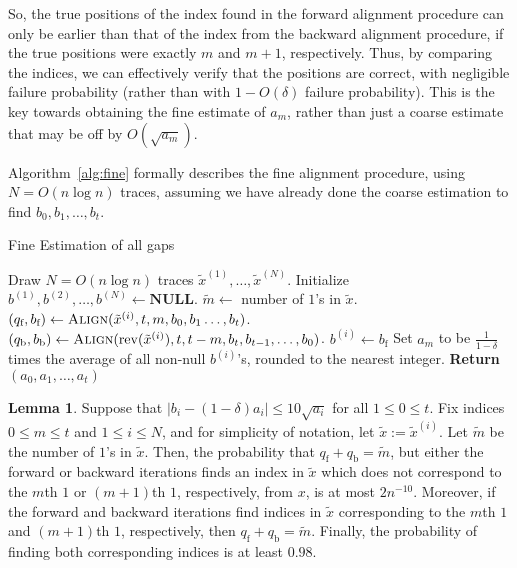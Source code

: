 \documentclass[12pt]{article}
\theoremstyle{definition}
\newtheorem{lemma}[theorem]{Lemma}
\theoremstyle{remark}
\DeclareMathOperator{\rev}{rev}
\begin{document}
So, the true positions of the index found in the forward alignment procedure can only be earlier than that of the index from the backward alignment procedure, if the true positions were exactly $m$ and $m+1$, respectively. Thus, by comparing the indices, we can effectively verify that the positions are correct, with negligible failure probability (rather than with $1-O(\delta)$ failure probability). This is the key towards obtaining the fine estimate of $a_m$, rather than just a coarse estimate that may be off by $O(\sqrt{a_m})$. 

Algorithm~\ref{alg:fine} formally describes the fine alignment procedure, using $N = O(n \log n)$ traces, assuming we have already done the coarse estimation to find $b_0, b_1, \dots, b_t$. 

\begin{algorithm}
\caption{Fine Estimation of all gaps}
\label{alg:fine}
\begin{algorithmic}[1]
\State Draw $N = O(n \log n)$ traces $\tilde{x}^{(1)},\dots,\tilde{x}^{(N)}$.
    \State Initialize $b^{(1)}, b^{(2)}, \dots, b^{(N)} \leftarrow \textbf{NULL}$.
        \State $\tilde{m} \leftarrow$ number of $1$'s in $\tilde{x}$.
        \State $(q_{\text{f}}, b_{\text{f}}) \leftarrow \textsc{Align}(\tilde{x}^{(i)}, t, m, b_0, b_1 \dots, b_t)$.
        \State $(q_{\text{b}}, b_{\text{b}}) \leftarrow \textsc{Align}(\rev(\tilde{x}^{(i)}), t, t-m, b_t, b_{t-1}, \dots, b_0)$.
            \State $b^{(i)} \leftarrow b_{\text{f}}$
        \EndIf
        \State Set $a_m$ to be $\frac{1}{1-\delta}$ times the average of all non-null $b^{(i)}$'s, rounded to the nearest integer.
    \EndFor
\EndFor
\State \textbf{Return} $(a_0, a_1, \dots, a_{t})$
\EndProcedure
\end{algorithmic}
\end{algorithm}

\begin{lemma} \label{lem:word-pushing}
    Suppose that $|b_i-(1-\delta) a_i| \le 10 \sqrt{a_i}$ for all $1 \le 0 \le t$. Fix indices $0 \le m \le t$ and $1 \le i \le N$, and for simplicity of notation, let $\tilde{x} := \tilde{x}^{(i)}$. Let $\tilde{m}$ be the number of $1$'s in $\tilde{x}$. Then, the probability that $q_{\text{f}}+q_{\text{b}} = \tilde{m}$, but either the forward or backward iterations finds an index in $\tilde{x}$ which does not correspond to the $m$th $1$ or $(m+1)$th $1$, respectively, from $x$, is at most $2n^{-10}$. Moreover, if the forward and backward iterations find indices in $\tilde{x}$ corresponding to the $m$th $1$ and $(m+1)$th $1$, respectively, then $q_{\text{f}}+q_{\text{b}} = \tilde{m}$. Finally, the probability of finding both corresponding indices is at least $0.98$.
\end{lemma}
\end{document}

